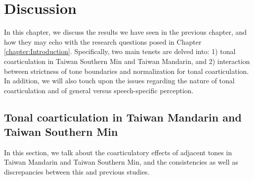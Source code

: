 
\chapter{Discussion}\label{chapter:Discussion}

In this chapter, we discuss the results we have seen in the previous chapter, and how they may echo with the research questions posed in Chapter \ref{chapter:Introduction}. Specifically, two main tenets are delved into: 1) tonal coarticulation in Taiwan Southern Min and Taiwan Mandarin, and 2) interaction between strictness of tone boundaries and normalization for tonal coarticulation. In addition, we will also touch upon the issues regarding the nature of tonal coarticulation and of general versus speech-specific perception.

\section{Tonal coarticulation in Taiwan Mandarin and Taiwan Southern Min}

In this section, we talk about the coarticulatory effects of adjacent tones in Taiwan Mandarin and Taiwan Southern Min, and the consistencies as well as discrepancies between this and previous studies.

